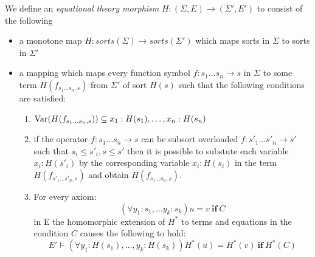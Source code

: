\begin{mydef}
 We define an \emph{equational theory morphism} $H: (\Sigma,E) \to (\Sigma', E')$ to consist of the following
\begin{itemize}
\item a monotone map $H:sorts(\Sigma) \to sorts(\Sigma')$ which maps  sorts in $\Sigma$  to sorts in $\Sigma'$

\item a mapping which maps every function symbol $f : s_1 \ldots s_n \to s$ in $\Sigma$ to some term $H(f_{s_1 \ldots s_n, s})$ from $\Sigma'$ of sort $H(s)$ such that the following conditions are satisfied:
\begin{enumerate}

\item  $\mathrm{Var}(H(f_{s_1 \ldots s_n, s})) \subseteq {x_1:H(s_1), \ldots, x_n:H(s_n)}$

\item if the operator $f: s_1 \ldots s_n \to s$ can be subsort overloaded $f: s'_1 \ldots s'_n \to s'$ such that $s_i \leq s'_i, s\leq s'$ then it is possible to substute each variable $x_i:H(s'_i)$ by the corresponding variable $x_i:H(s_i)$ in the term $H(f_{s'_1 \ldots s'_n, s})$ and obtain $H(f_{s_1 \ldots s_n, s})$.

\item For every axiom: $$(\forall y_1:s_1, \ldots y_k : s_k) u = v \ \textbf{if} \ C$$ in E the homomorphic extension of $H^*$ to terms and equations in the condition $C$ causes the following to hold:
   $$E' \models (\forall y_1 : H(s_1), \ldots, y_k : H(s_k)) H^*(u) = H^*(v) \ \textbf{if} \ H^*(C)$$

\end{enumerate}

\end{itemize}

\end{mydef}

